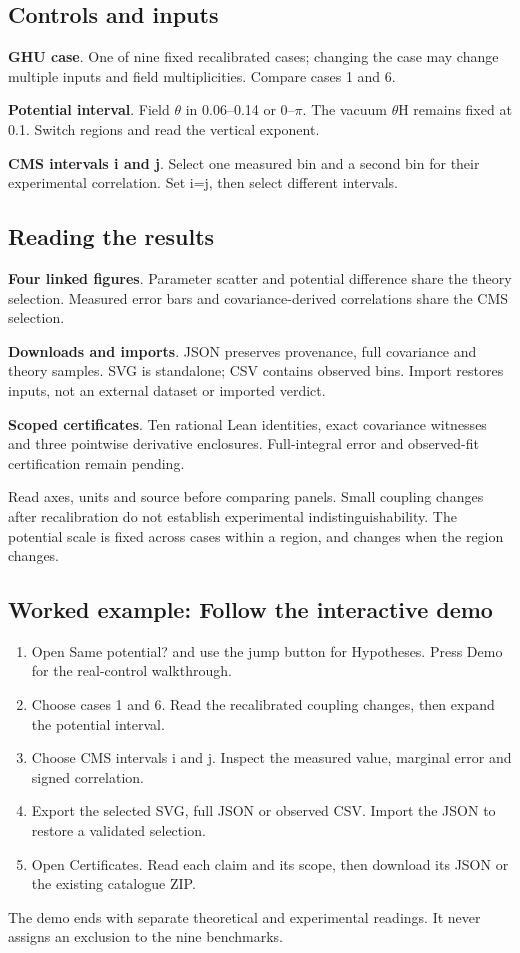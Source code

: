 \documentclass[11pt,a4paper]{article}
\begin{document}
\subsection*{Controls and inputs}
\textbf{GHU case}. One of nine fixed recalibrated cases; changing the case may change multiple inputs and field multiplicities. Compare cases 1 and 6.

\textbf{Potential interval}. Field \ensuremath{\theta} in 0.06--0.14 or 0--\ensuremath{\pi}. The vacuum \ensuremath{\theta}H remains fixed at 0.1. Switch regions and read the vertical exponent.

\textbf{CMS intervals i and j}. Select one measured bin and a second bin for their experimental correlation. Set i=j, then select different intervals.

\subsection*{Reading the results}
\textbf{Four linked figures}. Parameter scatter and potential difference share the theory selection. Measured error bars and covariance-derived correlations share the CMS selection.

\textbf{Downloads and imports}. JSON preserves provenance, full covariance and theory samples. SVG is standalone; CSV contains observed bins. Import restores inputs, not an external dataset or imported verdict.

\textbf{Scoped certificates}. Ten rational Lean identities, exact covariance witnesses and three pointwise derivative enclosures. Full-integral error and observed-fit certification remain pending.

Read axes, units and source before comparing panels. Small coupling changes after recalibration do not establish experimental indistinguishability. The potential scale is fixed across cases within a region, and changes when the region changes.
\subsection*{Worked example: Follow the interactive demo}
\begin{enumerate}
\item Open Same potential? and use the jump button for Hypotheses. Press Demo for the real-control walkthrough.
\item Choose cases 1 and 6. Read the recalibrated coupling changes, then expand the potential interval.
\item Choose CMS intervals i and j. Inspect the measured value, marginal error and signed correlation.
\item Export the selected SVG, full JSON or observed CSV. Import the JSON to restore a validated selection.
\item Open Certificates. Read each claim and its scope, then download its JSON or the existing catalogue ZIP.
\end{enumerate}
The demo ends with separate theoretical and experimental readings. It never assigns an exclusion to the nine benchmarks.
\end{document}
